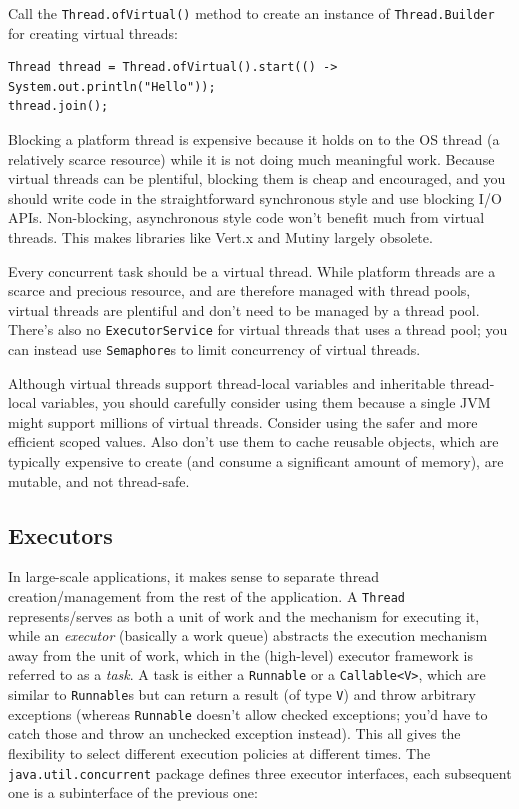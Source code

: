 \documentclass[table, xcdraw]{article}%
\begin{document}
Call the \texttt{Thread.ofVirtual()} method to create an instance of \texttt{Thread.Builder} for creating virtual threads:

\begin{verbatim}
Thread thread = Thread.ofVirtual().start(() -> System.out.println("Hello"));
thread.join();
\end{verbatim}

Blocking a platform thread is expensive because it holds on to the OS thread (a relatively scarce resource) while it is not doing much meaningful work. Because virtual threads can be plentiful, blocking them is cheap and encouraged, and you should write code in the straightforward synchronous style and use blocking I/O APIs. Non-blocking, asynchronous style code won't benefit much from virtual threads. This makes libraries like Vert.x and Mutiny largely obsolete.

Every concurrent task should be a virtual thread. While platform threads are a scarce and precious resource, and are therefore managed with thread pools, virtual threads are plentiful and don't need to be managed by a thread pool. There's also no \texttt{ExecutorService} for virtual threads that uses a thread pool; you can instead use \texttt{Semaphore}s to limit concurrency of virtual threads.

Although virtual threads support thread-local variables and inheritable thread-local variables, you should carefully consider using them because a single JVM might support millions of virtual threads. Consider using the safer and more efficient scoped values. Also don't use them to cache reusable objects, which are typically expensive to create (and consume a significant amount of memory), are mutable, and not thread-safe.

\subsection{Executors}

In large-scale applications, it makes sense to separate thread creation/management from the rest of the application. A \texttt{Thread} represents/serves as both a unit of work and the mechanism for executing it, while an \emph{executor} (basically a work queue) abstracts the execution mechanism away from the unit of work, which in the (high-level) executor framework is referred to as a \emph{task}. A task is either a \texttt{Runnable} or a \texttt{Callable<V>}, which are similar to \texttt{Runnable}s but can return a result (of type \texttt{V}) and throw arbitrary exceptions (whereas \texttt{Runnable} doesn't allow checked exceptions; you'd have to catch those and throw an unchecked exception instead). This all gives the flexibility to select different execution policies at different times. The \texttt{java.util.concurrent} package defines three executor interfaces, each subsequent one is a subinterface of the previous one:
\end{document}
